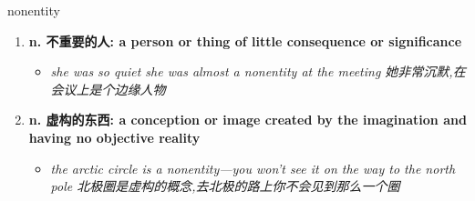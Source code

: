 
\begin{frame}
{\huge nonentity}
\begin{center}
\begin{enumerate}\Large
  \item \textbf{n. 不重要的人: a person or thing of little consequence or significance}
  \begin{itemize}
    \item \em{\Large{she was so quiet she was almost a nonentity at the meeting 她非常沉默,在会议上是个边缘人物}}
  \end{itemize}
  \item \textbf{n. 虚构的东西: a conception or image created by the imagination and having no objective reality}
  \begin{itemize}
    \item \em{\Large{the arctic circle is a nonentity—you won't see it on the way to the north pole 北极圈是虚构的概念,去北极的路上你不会见到那么一个圈}}
  \end{itemize}
\end{enumerate}
\end{center}
\end{frame}
